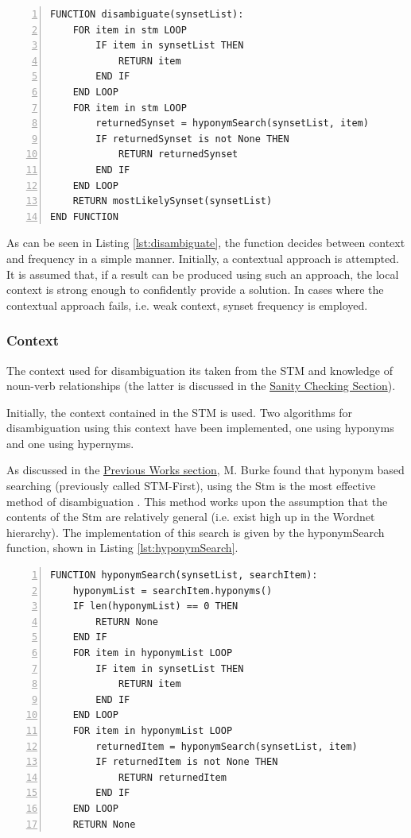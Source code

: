 \documentclass[]{article}
\begin{document}
\begin{lstlisting}[numbers=left, numberstyle=\small, caption={The disambiguate function}, captionpos=b, label={lst:disambiguate}]
FUNCTION disambiguate(synsetList):
    FOR item in stm LOOP
        IF item in synsetList THEN
            RETURN item
        END IF
    END LOOP
    FOR item in stm LOOP
        returnedSynset = hyponymSearch(synsetList, item)
        IF returnedSynset is not None THEN
            RETURN returnedSynset
        END IF
    END LOOP
    RETURN mostLikelySynset(synsetList)
END FUNCTION
\end{lstlisting}

As can be seen in Listing \ref{lst:disambiguate}, the function decides between context and frequency in a simple manner. Initially, a contextual approach is attempted. It is assumed that, if a result can be produced using such an approach, the local context is strong enough to confidently provide a solution. In cases where the contextual approach fails, i.e. weak context, synset frequency is employed.

\subsubsection{Context}
\label{sec:DisambiguationContext}
The context used for disambiguation its taken from the STM and knowledge of noun-verb relationships (the latter is discussed in the \hyperref[sec:Sanity]{Sanity Checking Section}).

Initially, the context contained in the STM is used. Two algorithms for disambiguation using this context have been implemented, one using hyponyms and one using hypernyms.

As discussed in the \hyperref[sec:MattBurke]{Previous Works section}, M. Burke found that hyponym based searching (previously called STM-First), using the Stm is the most effective method of disambiguation \cite{MattBurkePrevious}. This method works upon the assumption that the contents of the Stm are relatively general (i.e. exist high up in the Wordnet hierarchy). The implementation of this search is given by the hyponymSearch function, shown in Listing \ref{lst:hyponymSearch}.

\begin{lstlisting}[numbers=left, numberstyle=\small, caption={The hyponymSearch function}, captionpos=b, label={lst:hyponymSearch}]
FUNCTION hyponymSearch(synsetList, searchItem):
    hyponymList = searchItem.hyponyms()
    IF len(hyponymList) == 0 THEN
        RETURN None
    END IF
    FOR item in hyponymList LOOP
        IF item in synsetList THEN
            RETURN item
        END IF
    END LOOP
    FOR item in hyponymList LOOP
        returnedItem = hyponymSearch(synsetList, item)
        IF returnedItem is not None THEN
            RETURN returnedItem
        END IF
    END LOOP
    RETURN None
\end{lstlisting}
\end{document}
